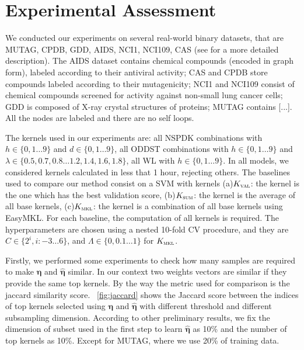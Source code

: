 \documentclass{esannV2}
\newcommand{\1}{{\bf 1}}
\newcommand{\kval}{$K_{\textsc{val}}$}
\newcommand{\ksum}{$K_{\textsc{sum}}$}
\newcommand{\kmkl}{$K_{\textsc{mkl}}$}
\begin{document}
\section{Experimental Assessment}
We conducted our experiments on several real-world binary datasets, that are MUTAG, CPDB, GDD, AIDS, NCI1, NCI109, CAS (see \cite{DaSanMartino2016} for a more detailed description).
{\color{red} The AIDS dataset contains chemical compounds (encoded in graph form), labeled according to
their antiviral activity; CAS and CPDB store compounds labeled according to their mutagenicity; NCI1 and NCI109 consist of chemical compounds screened for activity against non-small lung cancer cells; GDD is composed of X-ray crystal structures of proteins; MUTAG contains %
[...].
All the nodes are labeled and there are no self loops.}

The kernels used in our experiments are: all NSPDK combinations with $h \in \{0,1\dots9\}$ and $d \in \{0,1\dots9\}$, all ODDST combinations with $h \in \{0,1\dots9\}$ and $\lambda \in \{0.5, 0.7,0.8\dots1.2,1.4,1.6,1.8\}$, all WL with $h \in \{0,1\dots9\}$.
In all models, we considered kernels calculated in less that 1 hour, rejecting others.
The baselines used to compare our method consist on a SVM with kernels (a)\kval: the kernel is the one which has the best validation score, (b)\ksum: the kernel is the average of all base kernels, (c)\kmkl: the kernel is a combination of all base kernels using EasyMKL.
For each baseline, the computation of all kernels is required.
The hyperparameters are chosen using a nested 10-fold CV procedure, and they are $C\in\{2^i, i:-3\dots6\}$, and $\Lambda\in\{0,0.1\dots1\}$ for \kmkl.


Firstly, we performed some experiments to check how many samples are required to make $\boldsymbol{\eta}$ and $\hat{\boldsymbol{\eta}}$ similar.
In our context two weights vectors are similar if they provide the same top kernels. By the way the metric used for comparison is the jaccard similarity score. \figurename\ \ref{fig:jaccard} shows the Jaccard score between the indices of top kernels selected using $\boldsymbol{\eta}$ and $\hat{\boldsymbol{\eta}}$ with different threshold and different subsampling dimension.
According to other preliminary results, we fix the dimension of subset used in the first step to learn $\hat{\boldsymbol{\eta}}$ as 10\% and the number of top kernels as 10\%. Except for MUTAG, where we use 20\% of training data.
\end{document}
